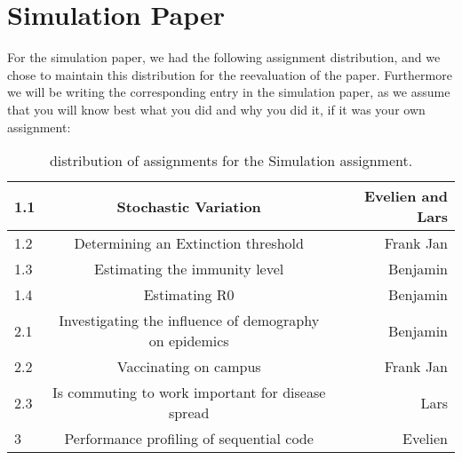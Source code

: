 \documentclass{article}
\begin{document}
\section{Simulation Paper}
For the simulation paper, we had the following assignment distribution, and we chose to maintain this distribution for the reevaluation of the paper. Furthermore we will be writing the corresponding entry in the simulation paper, as we assume that you will know best what you did and why you did it, if it was your own assignment: \\
\begin{table}[h!]
\centering
\begin{tabular}{| l | c | r |}
	\hline
	1.1 & Stochastic Variation & Evelien and Lars \\
	\hline
	1.2 & Determining an Extinction threshold & Frank Jan \\
	\hline
	1.3 & Estimating the immunity level & Benjamin \\
	\hline
	1.4 & Estimating R0 & Benjamin \\
	\hline
	2.1 & Investigating the influence of demography on epidemics & Benjamin \\
	\hline
	2.2 & Vaccinating on campus & Frank Jan \\
	\hline
	2.3 & Is commuting to work important for disease spread & Lars \\
	\hline
	3 & Performance profiling of sequential code & Evelien \\
	\hline
\end{tabular}
\caption{distribution of assignments for the Simulation assignment.}
\end{table}
\newpage
\end{document}
